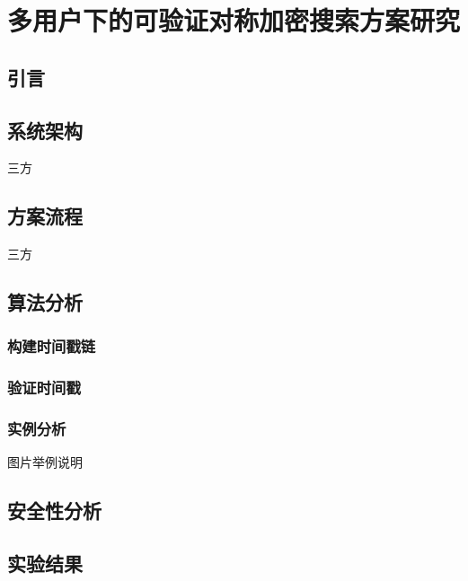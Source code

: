 \chapter{多用户下的可验证对称加密搜索方案研究}
\label{cha:multi-user}
\section{引言}

\section{系统架构} 三方

\section{方案流程} 三方

\section{算法分析}
\subsection{构建时间戳链}
\subsection{验证时间戳}
\subsection{实例分析} 图片举例说明

\section{安全性分析}

\section{实验结果}
